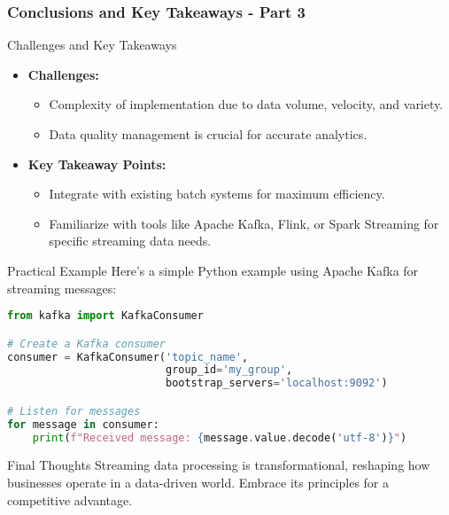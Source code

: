 \documentclass[aspectratio=169]{beamer}
\begin{document}
\begin{frame}[fragile]
    \frametitle{Conclusions and Key Takeaways - Part 3}
    \begin{block}{Challenges and Key Takeaways}
        \begin{itemize}
            \item \textbf{Challenges:}
                \begin{itemize}
                    \item Complexity of implementation due to data volume, velocity, and variety.
                    \item Data quality management is crucial for accurate analytics.
                \end{itemize}
            \item \textbf{Key Takeaway Points:}
                \begin{itemize}
                    \item Integrate with existing batch systems for maximum efficiency.
                    \item Familiarize with tools like Apache Kafka, Flink, or Spark Streaming for specific streaming data needs.
                \end{itemize}
        \end{itemize}
    \end{block}

    \begin{block}{Practical Example}
        Here’s a simple Python example using Apache Kafka for streaming messages:
        \begin{lstlisting}[language=Python]
from kafka import KafkaConsumer

# Create a Kafka consumer
consumer = KafkaConsumer('topic_name',
                         group_id='my_group',
                         bootstrap_servers='localhost:9092')

# Listen for messages
for message in consumer:
    print(f"Received message: {message.value.decode('utf-8')}")
        \end{lstlisting}
    \end{block}

    \begin{block}{Final Thoughts}
        Streaming data processing is transformational, reshaping how businesses operate in a data-driven world. Embrace its principles for a competitive advantage.
    \end{block}
\end{frame}
\end{document}
